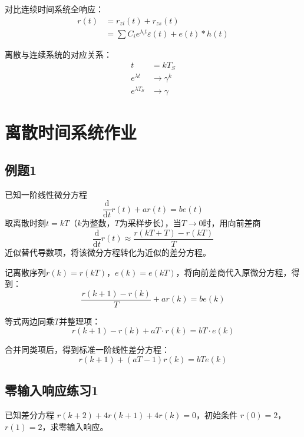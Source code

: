 \documentclass[UTF8]{ctexart}
\begin{document}
对比连续时间系统全响应：
$$
\begin{aligned}
r(t) & =r_{zi}(t)+r_{zs}(t) \\
& =\sum C_{i} e^{\lambda_{i} t} \varepsilon(t)+e(t) * h(t)
\end{aligned}
$$

离散与连续系统的对应关系：
$$
\begin{aligned}
t&=k T_{S} \\
e^{\lambda t} &\to \gamma^{k} \\
e^{\lambda T_{S}} &\to \gamma
\end{aligned}
$$

\section{离散时间系统作业}

\subsection{例题1}

\begin{problem}
已知一阶线性微分方程
$$
\frac{\mathrm{d}}{\mathrm{d}t} r(t) + a r(t) = b e(t)
$$
取离散时刻$t = kT$（$k$为整数，$T$为采样步长），当$T \to 0$时，用向前差商
$$
\frac{\mathrm{d}}{\mathrm{d}t} r(t) \approx \frac{r(kT + T) - r(kT)}{T}
$$
近似替代导数项，将该微分方程转化为近似的差分方程。
\end{problem}

\begin{solution}
记离散序列$r(k) = r(kT)$，$e(k) = e(kT)$，将向前差商代入原微分方程，得到：
$$
\frac{r(k+1) - r(k)}{T} + a r(k) = b e(k)
$$

等式两边同乘$T$并整理项：
$$
r(k+1) - r(k) + aT \cdot r(k) = bT \cdot e(k)
$$

合并同类项后，得到标准一阶线性差分方程：
$$
r(k+1) + (aT - 1) r(k) = bT e(k)
$$
\end{solution}

\subsection{零输入响应练习1}

\begin{problem}
已知差分方程 $r(k+2)+4r(k+1)+4r(k)=0$，初始条件 $r(0)=2$，$r(1)=2$，求零输入响应。
\end{problem}
\end{document}
